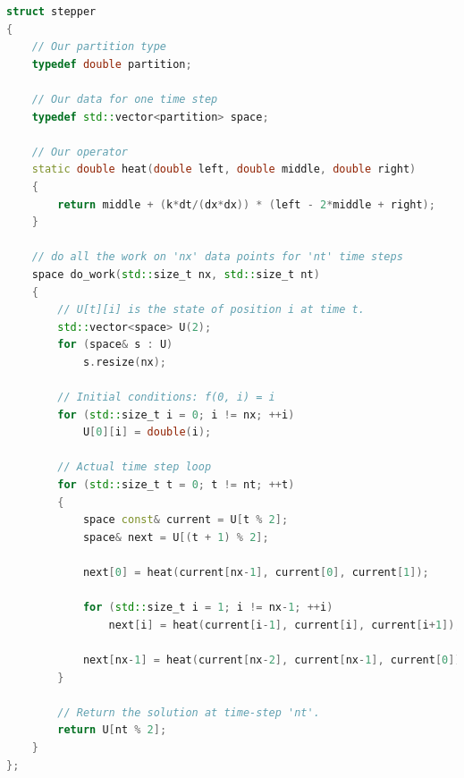 \begin{lstlisting}[language=c++,caption={Serial implementation of the one-dimensional heat equation \label{code:heat:central:difference}},float,floatplacement=tb]
struct stepper
{
    // Our partition type
    typedef double partition;

    // Our data for one time step
    typedef std::vector<partition> space;

    // Our operator
    static double heat(double left, double middle, double right)
    {
        return middle + (k*dt/(dx*dx)) * (left - 2*middle + right);
    }

    // do all the work on 'nx' data points for 'nt' time steps
    space do_work(std::size_t nx, std::size_t nt)
    {
        // U[t][i] is the state of position i at time t.
        std::vector<space> U(2);
        for (space& s : U)
            s.resize(nx);

        // Initial conditions: f(0, i) = i
        for (std::size_t i = 0; i != nx; ++i)
            U[0][i] = double(i);

        // Actual time step loop
        for (std::size_t t = 0; t != nt; ++t)
        {
            space const& current = U[t % 2];
            space& next = U[(t + 1) % 2];

            next[0] = heat(current[nx-1], current[0], current[1]);

            for (std::size_t i = 1; i != nx-1; ++i)
                next[i] = heat(current[i-1], current[i], current[i+1]);

            next[nx-1] = heat(current[nx-2], current[nx-1], current[0]);
        }

        // Return the solution at time-step 'nt'.
        return U[nt % 2];
    }
};
\end{lstlisting} 

